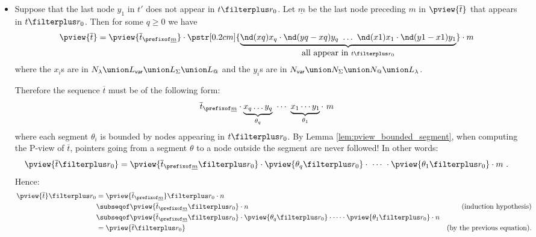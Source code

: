 \begin{itemize}
\begin{itemize}
        \item Suppose that the last node $y_1$ in $t'$ does not appear in $t\filterplus r_0$.
        Let $\underline{m}$ be the last node preceding $m$ in $\pview{\overline{t}}$ that appears in $t\filterplus r_0$. Then for some $q\geq 0$ we have
        \begin{equation*}
        \pview{\overline{t}} = \pview{\overline{t}_{\prefixof \underline{m}}} \cdot \pstr[0.2cm]{ \underbrace{\nd(xq){x_q} \cdot \nd(yq-xq){y_q}\ \ldots\ \nd(x1){x_1} \cdot \nd(y1-x1){y_1}}_{\mbox{all appear in } t\filterplus r_0}} \cdot m
        \end{equation*}
        where the $x_i$s are in $ N_\lambda \union L_{\sf var} \union  L_\Sigma \union L_@$ and the $y_i$s are in $N_{\sf var} \union N_\Sigma \union N_@ \union L_\lambda$.
        
        Therefore the sequence $\overline{t}$ must be of the following form:
        $$\overline{t}_{\prefixof \underline{m}} \cdot \underbrace{x_q \ldots y_q}_{\theta_q} \ \cdots \ \underbrace{x_1 \cdots y_1}_{\theta_1} \cdot\ m $$
        where each segment $\theta_i$ is bounded by nodes appearing in $t\filterplus r_0$.
        By Lemma \ref{lem:pview_bounded_segment}, when computing the P-view of $\overline{t}$, pointers going from a segment $\theta$ to a node outside the segment are never followed! In other words:
        $$ \pview{\overline{t} \filterplus r_0} = 
        \pview{\overline{t}_{\prefixof \underline{m}} \filterplus r_0} \cdot \pview{\theta_q \filterplus r_0} \cdot\ \cdots\
        \cdot \pview{\theta_1 \filterplus r_0} \cdot m \ .$$
        Hence:
            \begin{align*}
            \pview{\overline{t}} \filterplus r_0
            &= \pview{\overline{t}_{\prefixof \underline{m}}} \filterplus r_0 \cdot n \\
            &\subseqof \pview{\overline{t}_{\prefixof \underline{m}} \filterplus r_0}  \cdot n
                    & \mbox{(induction hypothesis)} \\
            &\subseqof \pview{\overline{t}_{\prefixof \underline{m}} \filterplus r_0} \cdot \pview{\theta_q \filterplus r_0} \cdot \cdots \cdot \pview{\theta_1 \filterplus r_0}  \cdot n \\
            &= \pview{\overline{t} \filterplus r_0}
                    & \mbox{(by the previous equation).}
          \end{align*}

        
        
        
    \end{itemize}


\end{itemize}
